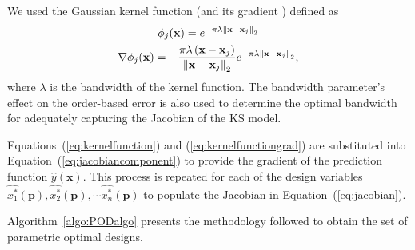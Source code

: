 We used the Gaussian kernel function (and its gradient ) defined as
\begin{gather}
	\label{eq:kernelfunction}
	\phi_j(\mathbf{x}) = e^{-\pi\lambda \left\lVert\mathbf{x}-\mathbf{x}_j\right\rVert_2}\\
	\label{eq:kernelfunctiongrad}
	\nabla\phi_j(\mathbf{x}) = -\dfrac{\pi\lambda\left(\mathbf{x} - \mathbf{x}_j\right)}{\left\lVert\mathbf{x} - \mathbf{x}_j\right\rVert_2}e^{-\pi\lambda \left\lVert\mathbf{x}-\mathbf{x}_j\right\rVert_2},
\end{gather}
where $\lambda$ is the bandwidth of the kernel function. The bandwidth parameter's effect on the order-based error is also used to determine the optimal bandwidth for adequately capturing the Jacobian of the \ac{KS} model.

Equations~(\ref{eq:kernelfunction}) and (\ref{eq:kernelfunctiongrad}) are substituted into Equation~(\ref{eq:jacobiancomponent}) to provide the gradient of the prediction function $\hat{y}(\mathbf{x})$. This process is repeated for each of the design variables $\hat{x_1^*}(\mathbf{p}), \hat{x_2^*}(\mathbf{p}), \cdots \hat{x_n^*}(\mathbf{p})$ to populate the Jacobian in Equation~(\ref{eq:jacobian}).

Algorithm~\ref{algo:PODalgo} presents the methodology followed to obtain the set of parametric optimal designs.

